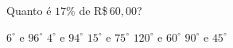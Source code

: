 Quanto é $17\%$ de R\$\,$60{,}00$?

$6^\circ$ e $96^\circ$
$4^\circ$ e $94^\circ$
$15^\circ$ e $75^\circ$
$120^\circ$ e $60^\circ$
$90^\circ$ e $45^\circ$




